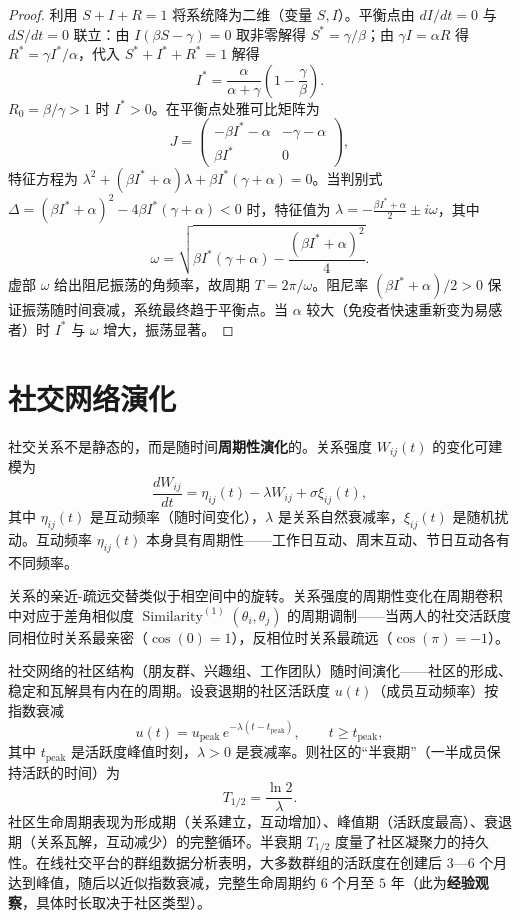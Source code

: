 \begin{proof}
利用 $S+I+R=1$ 将系统降为二维（变量 $S, I$）。平衡点由 $dI/dt = 0$ 与 $dS/dt = 0$ 联立：由 $I(\beta S-\gamma)=0$ 取非零解得 $S^* = \gamma/\beta$；由 $\gamma I = \alpha R$ 得 $R^* = \gamma I^*/\alpha$，代入 $S^*+I^*+R^*=1$ 解得
\[
I^* = \frac{\alpha}{\alpha+\gamma}\left(1-\frac{\gamma}{\beta}\right).
\]
$R_0 = \beta/\gamma > 1$ 时 $I^* > 0$。在平衡点处雅可比矩阵为
\[
J = \begin{pmatrix} -\beta I^* - \alpha & -\gamma - \alpha \\ \beta I^* & 0 \end{pmatrix},
\]
特征方程为 $\lambda^2 + (\beta I^*+\alpha)\lambda + \beta I^*(\gamma+\alpha) = 0$。当判别式 $\Delta = (\beta I^*+\alpha)^2 - 4\beta I^*(\gamma+\alpha) < 0$ 时，特征值为 $\lambda = -\frac{\beta I^*+\alpha}{2} \pm i\omega$，其中
\[
\omega = \sqrt{\beta I^*(\gamma+\alpha) - \frac{(\beta I^*+\alpha)^2}{4}}.
\]
虚部 $\omega$ 给出阻尼振荡的角频率，故周期 $T = 2\pi/\omega$。阻尼率 $(\beta I^*+\alpha)/2 > 0$ 保证振荡随时间衰减，系统最终趋于平衡点。当 $\alpha$ 较大（免疫者快速重新变为易感者）时 $I^*$ 与 $\omega$ 增大，振荡显著。
\end{proof}

\section{社交网络演化}

\begin{definition}[社交关系的周期演化]\label{def:relationship_cycle}
社交关系不是静态的，而是随时间\textbf{周期性演化}的。关系强度 $W_{ij}(t)$ 的变化可建模为
\[
\frac{dW_{ij}}{dt} = \eta_{ij}(t) - \lambda W_{ij} + \sigma \xi_{ij}(t),
\]
其中 $\eta_{ij}(t)$ 是互动频率（随时间变化），$\lambda$ 是关系自然衰减率，$\xi_{ij}(t)$ 是随机扰动。互动频率 $\eta_{ij}(t)$ 本身具有周期性——工作日互动、周末互动、节日互动各有不同频率。

关系的亲近-疏远交替类似于相空间中的旋转。关系强度的周期性变化在周期卷积中对应于差角相似度 $\operatorname{Similarity}^{(1)}(\theta_i, \theta_j)$ 的周期调制——当两人的社交活跃度同相位时关系最亲密（$\cos(0)=1$），反相位时关系最疏远（$\cos(\pi)=-1$）。
\end{definition}

\begin{proposition}[社交网络的社区结构周期]\label{prop:community_cycle}
社交网络的社区结构（朋友群、兴趣组、工作团队）随时间演化——社区的形成、稳定和瓦解具有内在的周期。设衰退期的社区活跃度 $u(t)$（成员互动频率）按指数衰减
\[
u(t) = u_{\text{peak}}\, e^{-\lambda (t - t_{\text{peak}})}, \qquad t \ge t_{\text{peak}},
\]
其中 $t_{\text{peak}}$ 是活跃度峰值时刻，$\lambda > 0$ 是衰减率。则社区的“半衰期”（一半成员保持活跃的时间）为
\[
T_{1/2} = \frac{\ln 2}{\lambda}.
\]
社区生命周期表现为形成期（关系建立，互动增加）、峰值期（活跃度最高）、衰退期（关系瓦解，互动减少）的完整循环。半衰期 $T_{1/2}$ 度量了社区凝聚力的持久性。在线社交平台的群组数据分析表明，大多数群组的活跃度在创建后 $3$—$6$ 个月达到峰值，随后以近似指数衰减，完整生命周期约 $6$ 个月至 $5$ 年（此为\textbf{经验观察}，具体时长取决于社区类型）。
\end{proposition}

